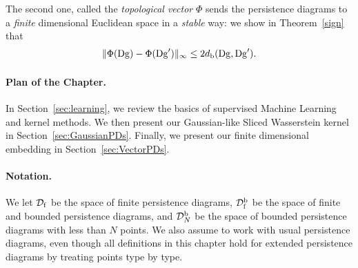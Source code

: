 The second one, called the {\em topological vector} $\Phi$ sends the persistence diagrams to a
{\em finite} dimensional Euclidean space in a {\em stable} way: we show in Theorem~\ref{sign} that
$$\|\Phi(\mathrm{Dg})-\Phi(\mathrm{Dg}')\|_\infty\leq 2d_{\rm b}(\mathrm{Dg},\mathrm{Dg}').$$

\paragraph*{Plan of the Chapter.} In Section~\ref{sec:learning}, we review the basics
of supervised Machine Learning and kernel methods. We then present our Gaussian-like Sliced Wasserstein kernel in Section~\ref{sec:GaussianPDs}. 
Finally, we present our finite dimensional
embedding in Section~\ref{sec:VectorPDs}.


\paragraph*{Notation.}
We let ${\mathcal D}_{\rm f}$ be the space of finite persistence diagrams,
${\mathcal D}_{\rm f}^{\rm b}$ be the space of finite and bounded persistence diagrams,
and ${\mathcal D}_N^{\rm b}$ be the space of bounded persistence diagrams with less than $N$ points.
We also assume to work with usual persistence diagrams, even though all definitions in this 
chapter hold for extended persistence diagrams by treating points type by type.

